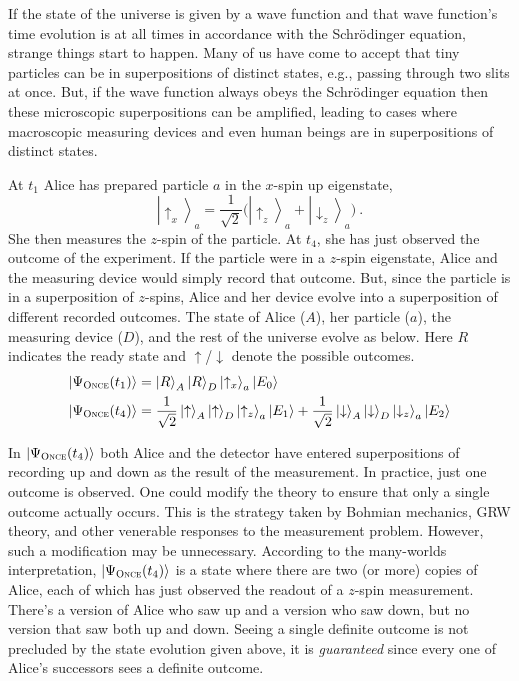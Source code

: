 \documentclass[onecolumn,secnumarabic,amsmath,amssymb,balancelastpage,nofootinbib]{article}
\newcommand{\ket}[1]{\ensuremath{\left|#1\right\rangle}}
\begin{document}
If the state of the universe is given by a wave function and that wave function's time evolution is at all times in accordance with the Schr\"{o}dinger equation, strange things start to happen.  Many of us have come to accept that tiny particles can be in superpositions of distinct states, e.g., passing through two slits at once.  But, if the wave function always obeys the Schr\"{o}dinger equation then these microscopic superpositions can be amplified, leading to cases where macroscopic measuring devices and even human beings are in superpositions of distinct states.

\begin{description}[font=\normalfont\scshape]
\item[Once] At $t_1$ Alice has prepared particle $a$ in the $x$-spin up eigenstate,
\begin{equation}
\ket{\uparrow_x}_a =  \frac{1}{\sqrt{2}}\Big(\ket{\uparrow_z}_a+\ket{\downarrow_z}_a\Big)\ .
\end{equation}
She then measures the $z$-spin of the particle. At $t_4$, she has just observed the outcome of the experiment.  If the particle were in a $z$-spin eigenstate, Alice and the measuring device would simply record that outcome.  But, since the particle is in a superposition of $z$-spins, Alice and her device evolve into a superposition of different recorded outcomes.  The state of Alice ($A$), her particle ($a$), the measuring device ($D$), and the rest of the universe evolve as below.  Here $R$ indicates the ready state and $\uparrow$/$\downarrow$ denote the possible outcomes.
\begin{align}
\ket{\Psi_{\textsc{Once}}(t_1)}&=\ket{R}_A\ket{R}_{D}\ket{\uparrow_x}_a\ket{E_0}
\nonumber
\\
\ket{\Psi_{\textsc{Once}}(t_4)}&=\frac{1}{\sqrt{2}}\ket{\uparrow}_A\ket{\uparrow}_{D}\ket{\uparrow_z}_a\ket{E_1}+\frac{1}{\sqrt{2}}\ket{\downarrow}_A\ket{\downarrow}_{D}\ket{\downarrow_z}_a\ket{E_2}
\label{once}
\end{align}
\end{description}	

In $\ket{\Psi_{\textsc{Once}}(t_4)}$ both Alice and the detector have entered superpositions of recording up and down as the result of the measurement.  In practice, just one outcome is observed.  One could modify the theory to ensure that only a single outcome actually occurs.  This is the strategy taken by Bohmian mechanics, GRW theory, and other venerable responses to the measurement problem.  However, such a modification may be unnecessary. According to the many-worlds interpretation, $\ket{\Psi_{\textsc{Once}}(t_4)}$ is a state where there are two (or more) copies of Alice, each of which has just observed the readout of a $z$-spin measurement.  There's a version of Alice who saw up and a version who saw down, but no version that saw both up and down.  Seeing a single definite outcome is not precluded by the state evolution given above, it is \emph{guaranteed} since every one of Alice's successors sees a definite outcome.
\end{document}
